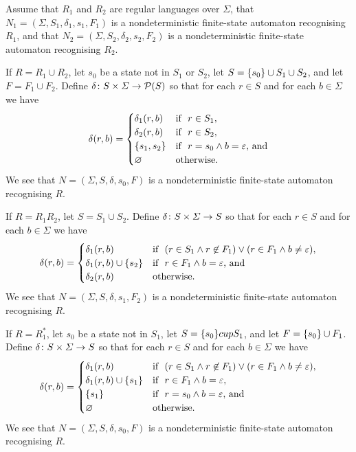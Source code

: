     Assume that \(R_1\) and \(R_2\) are regular languages over \(\varSigma\),
    that \(N_1 = (\varSigma, S_1, \delta_1, s_1, F_1)\) is a nondeterministic
    finite-state automaton recognising \(R_1\), and that \(N_2 = (\varSigma,
    S_2, \delta_2, s_2, F_2)\) is a nondeterministic finite-state automaton
    recognising \(R_2\).

    If \(R = R_1 \cup R_2\), let \(s_0\) be a state not in \(S_1\) or \(S_2\),
    let \(S = \{s_0\} \cup S_1 \cup S_2\), and let \(F = F_1 \cup F_2\).
    Define \(\delta\colon S \times \varSigma\to\mathcal{P}(S)\) so that for each \(r
    \in S\) and for each \(b \in \varSigma\) we have
    \[
        \delta(r, b) = \begin{cases}
            \delta_1(r, b) & \text{if }\ r \in S_1,\\
            \delta_2(r, b) & \text{if }\ r \in S_2,\\
            \{s_1, s_2\} & \text{if }\ r = s_0 \land b = \varepsilon \text{,
            and}\\
            \varnothing & \text{otherwise.}
        \end{cases}
    \]
    We see that \(N = (\varSigma, S, \delta, s_0, F)\) is a nondeterministic
    finite-state automaton recognising \(R\).

    If \(R = R_1 R_2\), let \(S = S_1 \cup S_2\). Define \(\delta\colon S \times
    \varSigma\to S\) so that for each \(r \in S\) and for each \(b \in
    \varSigma\) we have
    \[
        \delta(r, b) = \begin{cases}
            \delta_1(r, b) & \text{if }\ (r \in S_1 \land r \not\in F_1) \lor (r
            \in F_1 \land b \neq \varepsilon),\\
            \delta_1(r, b) \cup \{s_2\} & \text{if }\ r \in F_1 \land b =
            \varepsilon \text{, and}\\
            \delta_2(r, b) & \text{otherwise.}
        \end{cases}
    \]
    We see that \(N = (\varSigma, S, \delta, s_1, F_2)\) is a nondeterministic
    finite-state automaton recognising \(R\).

    If \(R = R_1^*\), let \(s_0\) be a state not in \(S_1\), let \(S = \{s_0\}
    cup S_1\), and let \(F = \{s_0\} \cup F_1\). Define \(\delta\colon S
    \times \varSigma\to S\) so that for each \(r \in S\) and for each \(b \in
    \varSigma\) we have
    \[
        \delta(r, b) = \begin{cases}
            \delta_1(r, b) & \text{if }\ (r \in S_1 \land r \not\in F_1) \lor (r
            \in F_1 \land b \neq \varepsilon),\\
            \delta_1(r, b) \cup \{s_1\} & \text{if }\ r \in F_1 \land b =
            \varepsilon,\\
            \{s_1\} & \text{if }\ r = s_0 \land b = \varepsilon \text{, and}\\
            \varnothing & \text{otherwise.}
        \end{cases}
    \]
    We see that \(N = (\varSigma, S, \delta, s_0, F)\) is a nondeterministic
    finite-state automaton recognising \(R\).


